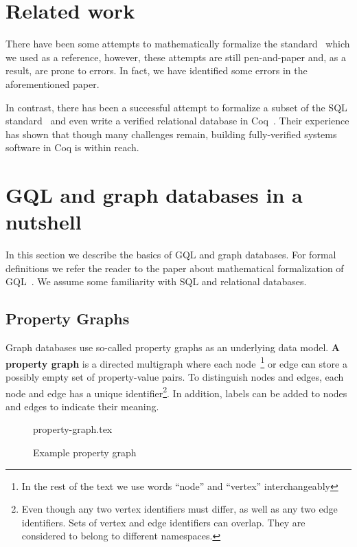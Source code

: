 \documentclass[14pt]{constructor-thesis}
\begin{document}
\section{Related work}

There have been some attempts to mathematically formalize the standard~\cite{GQL-formalized-on-paper} which we used as a reference, however, these attempts are still pen-and-paper and, as a result, are prone to errors. In fact, we have identified some errors in the aforementioned paper.

In contrast, there has been a successful attempt to formalize a subset of the SQL standard~\cite{sql-in-coq} and even write a verified relational database in Coq~\cite{rdbms-in-coq}. Their experience has shown that though many challenges remain, building fully-verified systems software in Coq is within reach.

\section{GQL and graph databases in a nutshell}

In this section we describe the basics of GQL and graph databases. For formal definitions we refer the reader to the paper about mathematical formalization of GQL~\cite{GQL-formalized-on-paper}. We assume some familiarity with SQL and relational databases.

\subsection{Property Graphs}

Graph databases use so-called property graphs as an underlying data model. \textbf{A property graph} is a directed multigraph where each node~\footnote{In the rest of the text we use words ``node'' and ``vertex'' interchangeably} or edge can store a possibly empty set of property-value pairs. To distinguish nodes and edges, each node and edge has a unique identifier\footnote{Even though any two vertex identifiers must differ, as well as any two edge identifiers. Sets of vertex and edge identifiers can overlap. They are considered to belong to different namespaces.}. In addition, labels can be added to nodes and edges to indicate their meaning.

\begin{figure}[b]
  \centering
  
  {property-graph.tex}

  \caption{Example property graph}
  \label{fig:property-graph}
\end{figure}
\end{document}

